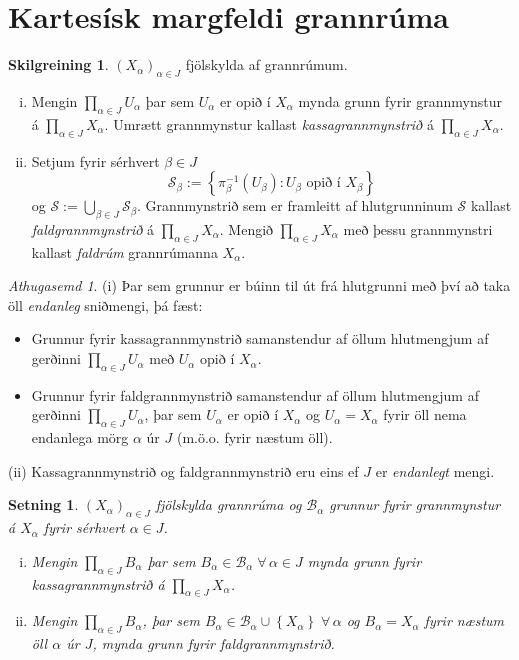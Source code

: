\documentclass[a4paper,icelandic]{book}
\theoremstyle{definition}
\newtheorem{skilgr}{Skilgreining}[section]
\theoremstyle{plain}
\newtheorem{setn}{Setning}[section]
\theoremstyle{remark}
\newtheorem*{ath}{Athugasemd}
\begin{document}
\section{Kartesísk margfeldi grannrúma}
\begin{skilgr}
  $(X_\alpha)_{\alpha\in J}$ fjölskylda af grannrúmum.

  \begin{enumerate}[(i)]
    \item Mengin $\prod_{\alpha\in J}U_\alpha$ þar sem $U_\alpha$ er opið í
      $X_\alpha$ mynda grunn fyrir grannmynstur á $\prod_{\alpha\in J}X_\alpha$.
      Umrætt grannmynstur kallast
      \emph{kassagrannmynstrið} á $\prod_{\alpha\in
      J}X_\alpha$.
    \item Setjum fyrir sérhvert $\beta\in J$
      \[
      \mathcal S_{\beta} 
      := \left\{ \pi^{-1}_\beta (U_\beta) : U_\beta\text{ opið í }
      X_\beta\right\}
      \]
      og $\mathcal S := \bigcup_{\beta\in J} \mathcal S_\beta$. Grannmynstrið
      sem er framleitt af hlutgrunninum $\mathcal S$ kallast
      \emph{faldgrannmynstrið} á $\prod_{\alpha\in J}
      X_{\alpha}$. Mengið $\prod_{\alpha\in J}X_\alpha$ með þessu grannmynstri
      kallast \emph{faldrúm} grannrúmanna $X_\alpha$.
  \end{enumerate}
  \end{skilgr}
\begin{ath}
  (i) Þar sem grunnur er búinn til út frá hlutgrunni með því að taka öll
  \emph{endanleg} sniðmengi, þá fæst:
  \begin{itemize}
    \item Grunnur fyrir kassagrannmynstrið samanstendur af öllum hlutmengjum af
      gerðinni $\prod_{\alpha\in J}U_\alpha$ með $U_\alpha$ opið í $X_\alpha$.
    \item Grunnur fyrir faldgrannmynstrið samanstendur af öllum hlutmengjum af
      gerðinni $\prod_{\alpha\in J}U_\alpha$, þar sem $U_\alpha$ er opið í
      $X_\alpha$ og $U_\alpha = X_\alpha$ fyrir öll nema endanlega mörg
      $\alpha$ úr $J$ (m.ö.o. fyrir næstum öll). 
  \end{itemize}

  (ii) Kassagrannmynstrið og faldgrannmynstrið eru eins ef $J$ er
  \emph{endanlegt} mengi.
\end{ath}
\begin{setn}
  $(X_\alpha)_{\alpha\in J}$ fjölskylda grannrúma og $\mathcal B_{\alpha}$
  grunnur fyrir grannmynstur á $X_\alpha$ fyrir sérhvert $\alpha\in J$. 
  \begin{enumerate}[(i)]
    \item Mengin $\prod_{\alpha\in J}B_\alpha$ þar sem $B_\alpha\in\mathcal
      B_\alpha\;\forall\,\alpha\in J$ mynda grunn fyrir kassagrannmynstrið á
      $\prod_{\alpha\in J}X_\alpha$.
    \item Mengin $\prod_{\alpha\in J}B_\alpha$, þar sem $B_\alpha\in\mathcal
      B_\alpha \cup \left\{ X_\alpha \right\}\; \forall\,\alpha$ og $B_\alpha =
      X_\alpha$ fyrir næstum öll $\alpha$ úr $J$, mynda grunn fyrir
      faldgrannmynstrið. 
  \end{enumerate}
\end{setn}
\end{document}
